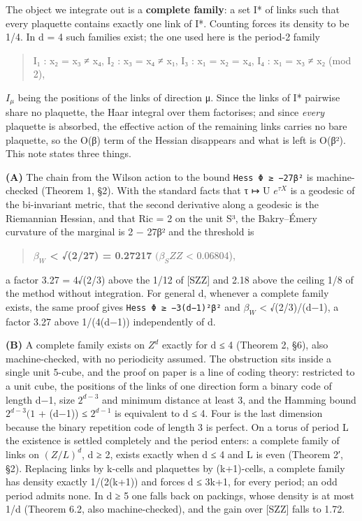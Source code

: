 \documentclass[11pt,a4paper]{article}
\theoremstyle{named}
\begin{document}
The object we integrate out is a \textbf{complete family}: a set I* of links such that every plaquette contains exactly one link of I*. Counting forces its density to be 1/4. In d = 4 such families exist; the one used here is the period-2 family

\begin{quote}
I₁ : x₂ = x₃ ≠ x₄,  I₂ : x₃ = x₄ ≠ x₁,  I₃ : x₁ = x₂ = x₄,  I₄ : x₁ = x₃ ≠ x₂  (mod 2),
\end{quote}
$I_{μ}$ being the positions of the links of direction μ. Since the links of I* pairwise share no plaquette, the Haar integral over them factorises; and since \textit{every} plaquette is absorbed, the effective action of the remaining links carries no bare plaquette, so the O(β) term of the Hessian disappears and what is left is O(β²). This note states three things.

\textbf{(A)} The chain from the Wilson action to the bound \texttt{Hess\ \allowbreak{}Φ\ \allowbreak{}≥\ \allowbreak{}−27β²} is machine-checked (Theorem 1, §2). With the standard facts that τ ↦ U $e^{τX}$ is a geodesic of the bi-invariant metric, that the second derivative along a geodesic is the Riemannian Hessian, and that Ric = 2 on the unit S³, the Bakry–Émery curvature of the marginal is 2 − 27β² and the threshold is

\begin{quote}
\textbf{$β_W$ \textless{} √(2/27) = 0.27217}  $(β_SZZ$ \textless{} 0.06804),
\end{quote}
a factor 3.27 = 4√(2/3) above the 1/12 of [SZZ] and 2.18 above the ceiling 1/8 of the method without integration. For general d, whenever a complete family exists, the same proof gives \texttt{Hess\ \allowbreak{}Φ\ \allowbreak{}≥\ \allowbreak{}−3(d−1)²β²} and $β_W$ \textless{} √(2/3)/(d−1), a factor 3.27 above 1/(4(d−1)) independently of d.

\textbf{(B)} A complete family exists on $Z^d$ exactly for d ≤ 4 (Theorem 2, §6), also machine-checked, with no periodicity assumed. The obstruction sits inside a single unit 5-cube, and the proof on paper is a line of coding theory: restricted to a unit cube, the positions of the links of one direction form a binary code of length d−1, size $2^{d−3}$ and minimum distance at least 3, and the Hamming bound $2^{d−3}(1$ + (d−1)) ≤ $2^{d−1}$ is equivalent to d ≤ 4. Four is the last dimension because the binary repetition code of length 3 is perfect. On a torus of period L the existence is settled completely and the period enters: a complete family of links on $(Z/L)^d$, d ≥ 2, exists exactly when d ≤ 4 and L is even (Theorem 2′, §2). Replacing links by k-cells and plaquettes by (k+1)-cells, a complete family has density exactly 1/(2(k+1)) and forces d ≤ 3k+1, for every period; an odd period admits none. In d ≥ 5 one falls back on packings, whose density is at most 1/d (Theorem 6.2, also machine-checked), and the gain over [SZZ] falls to 1.72.
\end{document}
